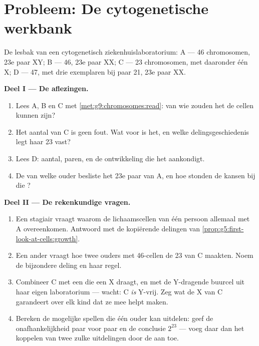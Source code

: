 \section{Probleem: De cytogenetische werkbank}

\begin{problem}\label{pb:g9:chromosomes:1}
De lesbak van een cytogenetisch ziekenhuislaboratorium:
 A --- 46 chromosomen, 23e paar XY; B --- 46, 23e paar
XX; C --- 23 chromosomen, met daaronder één X; D --- 47, met
drie exemplaren bij paar 21, 23e paar XX.

\medskip\noindent\textbf{Deel I --- De aflezingen.}
\begin{enumerate}
  \item Lees A, B en C met
        \cref{met:g9:chromosomes:read}: van wie zouden het de
        cellen kunnen zijn?
  \item Het aantal van C is geen fout. Wat voor  is het, en
        welke delingsgeschiedenis legt haar 23 vast?
  \item Lees D: aantal, paren, en de ontwikkeling die het
        aankondigt.
  \item De  van welke ouder besliste het 23e paar
        van A, en hoe stonden de kansen bij die ?
\end{enumerate}

\medskip\noindent\textbf{Deel II --- De rekenkundige
vragen.}
\begin{enumerate}[resume]
  \item Een stagiair vraagt waarom de lichaamscellen van één
        persoon allemaal met  A overeenkomen.
        Antwoord met de kopiërende delingen van
        \cref{prop:g5:first-look-at-cells:growth}.
  \item Een ander vraagt hoe twee ouders met 46-cellen de 23
        van C maakten. Noem de bijzondere deling en haar regel.
  \item Combineer C met een  die een X draagt, en met de
        Y-dragende buurcel uit haar eigen laboratorium --- wacht:
        C \emph{is} Y-vrij. Zeg wat de X van C garandeert over
        elk kind dat ze mee helpt maken.
  \item Bereken de mogelijke spellen die één ouder kan
        uitdelen: geef de onafhankelijkheid paar voor paar en de
        conclusie $2^{23}$ --- voeg daar dan het koppelen van
        twee zulke uitdelingen door de  aan toe.
\end{enumerate}


\end{problem}
